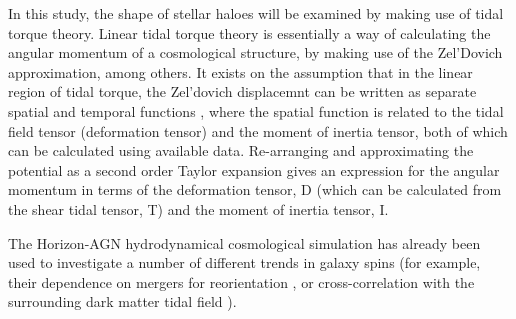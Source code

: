 In this study, the shape of stellar haloes will be examined by making use of tidal torque theory. Linear tidal torque theory is essentially a way of calculating the angular momentum of a cosmological structure, by making use of the Zel'Dovich approximation, among others. It exists on the assumption that in the linear region of tidal torque, the Zel'dovich displacemnt can be written as separate spatial and temporal functions \cite{porciani02a}, where the spatial function is related to the tidal field tensor (deformation tensor) and the moment of inertia tensor, both of which can be calculated using available data. Re-arranging and approximating the potential as a second order Taylor expansion gives an expression for the angular momentum in terms of the deformation tensor, D (which can be calculated from the shear tidal tensor, T) and the moment of inertia tensor, I. 

The Horizon-AGN hydrodynamical cosmological simulation has already been used to investigate a number of different trends in galaxy spins (for example, their dependence on mergers for reorientation \cite{welker14}, or cross-correlation with the surrounding dark matter tidal field \cite{codis15}).
